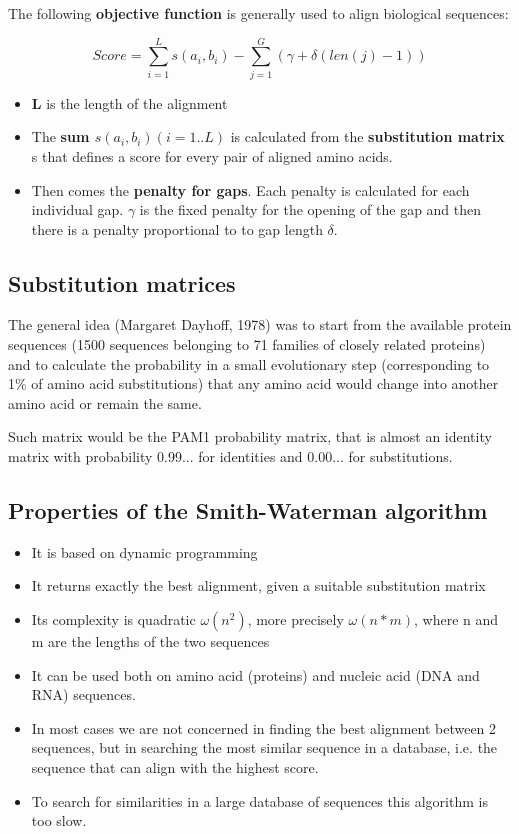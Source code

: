The following \textbf{objective function} is generally used to align biological 
sequences: 

\begin{equation}
Score = \sum_{i=1}^{L} s(a_i,b_i) - \sum_{j=1}^{G} (\gamma + \delta(len(j)-1))
\end{equation}

\begin{itemize}
	\item \textbf{L} is the length of the alignment
	\item The \textbf{sum $ s(a_i,b_i) (i=1..L) $} is calculated from the 
\textbf{substitution 
matrix} s that defines a score for every pair of aligned amino acids.
	\item Then comes the \textbf{penalty for gaps}. Each penalty is calculated
 for each individual gap. \textbf{$\gamma$} is the fixed penalty for the
 opening of the gap and then there is a penalty proportional to to gap length 
\textbf{$\delta$}.
\end{itemize}

\subsection{Substitution matrices}

The general idea (Margaret Dayhoff, 1978) was to start from the available 
protein sequences (1500 sequences belonging to 71 families of closely related 
proteins) and to calculate the probability in a small evolutionary step 
(corresponding to 1\% of amino acid substitutions) that any amino acid would 
change into another amino acid or remain the same.

Such matrix would be the PAM1 probability matrix, that is almost an identity 
matrix with probability 0.99... for identities and 0.00... for substitutions.

\subsection{Properties of the Smith-Waterman algorithm}

\begin{itemize}
	\item It is based on dynamic programming
	\item It returns exactly the best alignment, given a suitable substitution
 matrix
	\item Its complexity is quadratic $\omega(n^2)$, more precisely 
$\omega(n*m)$, where n and m are the lengths of the two sequences
	\item It can be used both on amino acid (proteins) and nucleic acid 
(DNA and RNA) sequences.
	\item In most cases we are not concerned in finding the best alignment 
between 2 sequences, but in searching the most similar sequence in a database, 
i.e. the sequence that can align with the highest score.
	\item To search for similarities in a large database of sequences this 
algorithm is too slow.
\end{itemize}
